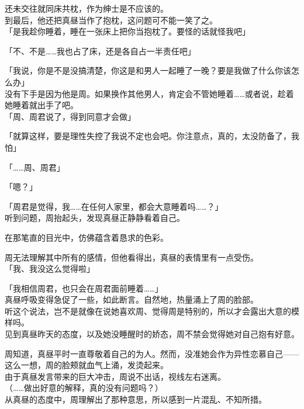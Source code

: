 还未交往就同床共枕，作为绅士是不应该的。\\

到最后，他还把真昼当作了抱枕，这问题可不能一笑了之。\\

「是我趁你睡着，睡在一张床上把你当抱枕了。要怪的话就怪我吧」

「不、不是……我也占了床，还是各自占一半责任吧」

「我说，你是不是没搞清楚，你这是和男人一起睡了一晚？要是我做了什么你该怎么办」\\

没有下手是因为他是周。如果换作其他男人，肯定会不管她睡着……或者说，趁着她睡着就出手了吧。\\

「周、周君说了，得到同意才会做」

「就算这样，要是理性失控了我说不定也会吧。你注意点，真的，太没防备了，我怕」

「……周、周君」

「嗯？」

「周君是觉得，我……在任何人家里，都会大意睡着吗……？」\\

听到问题，周抬起头，发现真昼正静静看着自己。

在那笔直的目光中，仿佛蕴含着恳求的色彩。

周无法理解其中所有的感情，但他看得出，真昼的表情里有一点受伤。\\

「我、我没这么觉得啦」

「我相信周君，也只会在周君面前睡着……」\\

真昼呼吸变得急促了一些，如此断言。自然地，热量涌上了周的脸部。\\

听这个说法，岂不是就像在说她喜欢周、觉得周是特别的，所以才会露出大意的模样吗。\\

见到真昼昨天的态度，以及她没睡醒时的娇态，周不禁会觉得她对自己抱有好意。

周知道，真昼平时一直尊敬着自己的为人。然而，没准她会作为异性恋慕自己——这么一想，周的脸颊就血气上涌，发烫起来。\\

由于真昼发言带来的巨大冲击，周说不出话，视线左右迷离。\\

（……做出好意的解释，真的没有问题吗？）\\

从真昼的态度中，周理解出了那种意思，所以感到一片混乱、不知所措。

